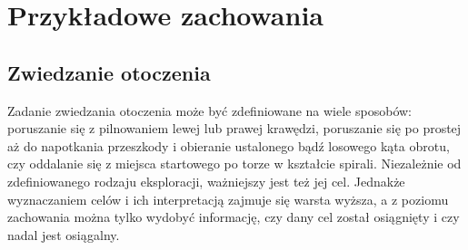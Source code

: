 
\section{Przykładowe zachowania}

\subsection{Zwiedzanie otoczenia}

Zadanie zwiedzania otoczenia może być zdefiniowane na wiele sposobów: poruszanie się z pilnowaniem lewej lub prawej krawędzi, poruszanie się po prostej aż do napotkania przeszkody i obieranie ustalonego bądź losowego kąta obrotu, czy oddalanie się z miejsca startowego po torze w kształcie spirali. Niezależnie od zdefiniowanego rodzaju eksploracji, ważniejszy jest też jej cel. Jednakże wyznaczaniem celów i ich interpretacją zajmuje się warsta wyższa, a z poziomu zachowania można tylko wydobyć informację, czy dany cel został osiągnięty i czy nadal jest osiągalny.
